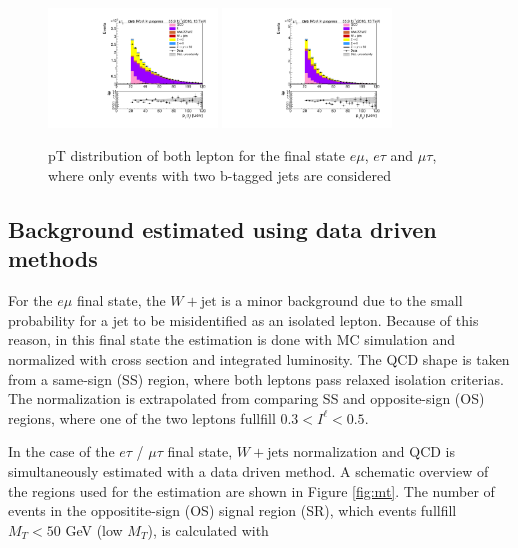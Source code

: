 \begin{figure}[htp]
	\includegraphics[width=0.4\textwidth]{plots/mt/TransverseMomentum1_TTBARCR.pdf}
	\includegraphics[width=0.4\textwidth]{plots/mt/TransverseMomentum2_TTBARCR.pdf}

	\caption[\gls{pT} distribution for \gls{TTBAR} control region]{\gls{pT} distribution of both lepton for the final state $e\mu$, $e\tau$ and $\mu\tau$, where only events with two b-tagged jets are considered}
	\label{fig:fig_3_9}
\end{figure}

\subsection{Background estimated using data driven methods}

For the $e\mu$ final state, the $W + \text{jet}$ is a minor background due to the small probability for a jet to be misidentified as an isolated lepton. Because of this reason, in this final state the estimation is done with MC simulation and normalized with cross section and integrated luminosity. The QCD shape is taken from a same-sign (SS) region, where both leptons pass relaxed isolation criterias. The normalization is extrapolated from comparing SS and opposite-sign (OS) regions, where one of the two leptons fullfill $0.3 < I^{\ell} < 0.5$. 

In the case of the $e\tau$ / $\mu\tau$ final state, $W + \text{jets}$ normalization and QCD is simultaneously estimated with a data driven method. A schematic overview of the regions used for the estimation are shown in Figure \ref{fig:mt}. The number of events in the oppositite-sign (OS) signal region (SR), which events fullfill $M_T < 50$ GeV (low $M_T$), is calculated with 

